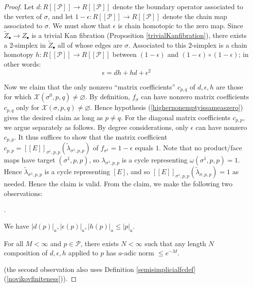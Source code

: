 \documentclass[12pt]{article}
\theoremstyle{definition}
\theoremstyle{remark}
\numberwithin{equation}{subsection}
\newcommand{\X}{\mathcal X}
\newcommand{\PPP}{\mathcal P}
\newcounter{rcounti}
\newenvironment{rlist}{\begin{list}{\roman{rcounti}.}{\usecounter{rcounti}
\setlength\itemsep{0pt}
\setlength\labelsep{4pt}
\setlength\labelwidth{16pt}
\setlength\leftmargin{32pt}
\setlength\listparindent{0pt}
\setlength\parsep{0pt}
\setlength\parskip{0pt}
\setlength\partopsep{0pt}
\setlength\rightmargin{0pt}
\setlength\topsep{0pt}
\setlength\itemindent{0pt}
}}{\end{list}}
\begin{document}
\begin{proof}
Let $d:R[[\PPP]]\to R[[\PPP]]$ denote the boundary operator associated to the vertex of $\sigma$, and let $1-\epsilon:R[[\PPP]]\to R[[\PPP]]$ denote the chain map associated to $\sigma$.  We must show that $\epsilon$ is chain homotopic to the zero map.  Since $\tilde Z_\bullet\to Z_\bullet$ is a trivial Kan fibration (Proposition \ref{trivialKanfibration}), there exists a $2$-simplex in $\tilde Z_\bullet$ all of whose edges are $\sigma$.  Associated to this $2$-simplex is a chain homotopy $h:R[[\PPP]]\to R[[\PPP]]$ between $(1-\epsilon)$ and $(1-\epsilon)\circ(1-\epsilon)$; in other words:
\begin{equation}
\epsilon=dh+hd+\epsilon^2
\end{equation}

Now we claim that the only nonzero ``matrix coefficients'' $c_{p,q}$ of $d,\epsilon,h$ are those for which $\X(\sigma^0,p,q)\ne\varnothing$.  By definition, $f_\sigma$ can have nonzero matrix coefficients $c_{p,q}$ only for $\X(\sigma,p,q)\ne\varnothing$.  Hence hypothesis (\ref{highernonemptyissameaszero}) gives the desired claim as long as $p\ne q$.  For the diagonal matrix coefficients $c_{p,p}$, we argue separately as follows.  By degree considerations, only $\epsilon$ can have nonzero $c_{p,p}$.  It thus suffices to show that the matrix coefficient $c_{p,p}=[[E]]_{\sigma^1,p,p}(\tilde\lambda_{\sigma^1,p,p})$ of $f_{\sigma^1}=1-\epsilon$ equals $1$.  Note that no product/face maps have target $(\sigma^1,p,p)$, so $\lambda_{\sigma^1,p,p}$ is a cycle representing $\omega(\sigma^1,p,p)=1$.  Hence $\tilde\lambda_{\sigma^1,p,p}$ is a cycle representing $[E]$, and so $[[E]]_{\sigma^1,p,p}(\tilde\lambda_{\sigma,p,p})=1$ as needed.  Hence the claim is valid.  From the claim, we make the following two observations:
\begin{rlist}
\item\label{firstO}We have $\left|d(p)\right|_a,\left|\epsilon(p)\right|_a,\left|h(p)\right|_a\leq\left|p\right|_a$.
\item\label{secondO}For all $M<\infty$ and $p\in\PPP$, there exists $N<\infty$ such that any length $N$ composition of $d,\epsilon,h$ applied to $p$ has $a$-adic norm $\leq e^{-M}$.
\end{rlist}
(the second observation also uses Definition \ref{semisimplicialfcdef}(\ref{novikovfiniteness})).


\end{proof}
\end{document}
